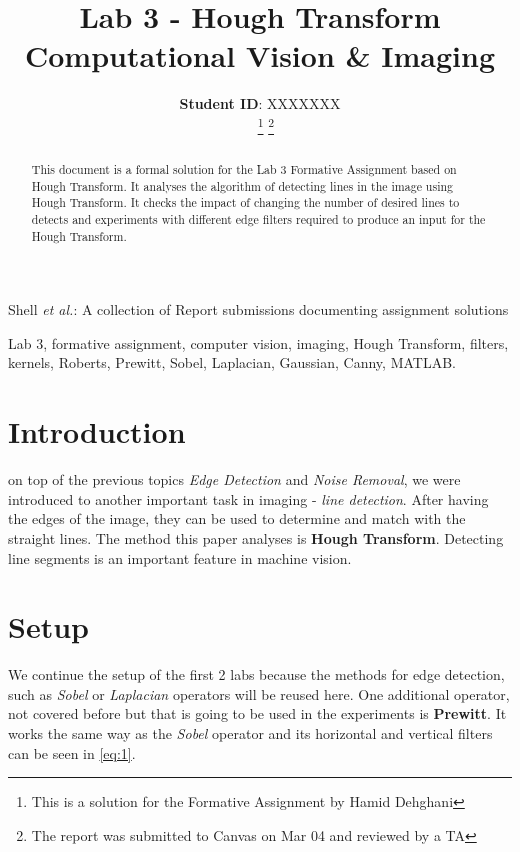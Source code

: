 \documentclass[lettersize,journal]{IEEEtran}
\begin{document}
\title{Lab 3 - Hough Transform \\ \vspace{0.1em} \LARGE Computational Vision \& Imaging}

\author{\textbf{Student ID}: XXXXXXX \\
~
\thanks{This is a solution for the Formative Assignment by Hamid Dehghani}
\thanks{The report was submitted to Canvas on Mar 04 and reviewed by a TA}}

%
{Shell \MakeLowercase{\textit{et al.}}: A collection of Report submissions documenting assignment solutions}

\maketitle

\begin{abstract}
This document is a formal solution for the Lab 3 Formative Assignment based on Hough Transform. It analyses the algorithm of detecting lines in the image using Hough Transform. It checks the impact of changing the number of desired lines to detects and experiments with different edge filters required to produce an input for the Hough Transform.
\end{abstract}

\begin{IEEEkeywords}
Lab 3, formative assignment, computer vision, imaging, Hough Transform, filters, kernels, Roberts, Prewitt, Sobel, Laplacian, Gaussian, Canny, MATLAB.
\end{IEEEkeywords}

\section{Introduction}
 on top of the previous topics \emph{Edge Detection} and \emph{Noise Removal}, we were introduced to another important task in imaging - \emph{line detection}. After having the edges of the image, they can be used to determine and match with the straight lines. The method this paper analyses is \textbf{Hough Transform}. Detecting line segments is an important feature in machine vision.

\section{Setup}
We continue the setup of the first 2 labs because the methods for edge detection, such as \emph{Sobel} or \emph{Laplacian} operators will be reused here. One additional operator, not covered before but that is going to be used in the experiments is \textbf{Prewitt}. It works the same way as the \emph{Sobel} operator and its horizontal and vertical filters can be seen in \autoref{eq:1}. 
\end{document}
